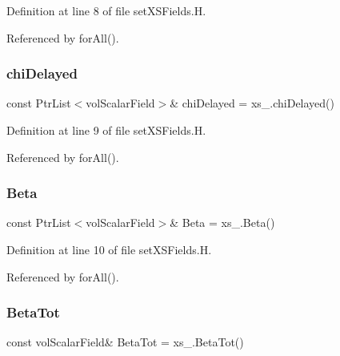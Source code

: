 Definition at line 8 of file set\+X\+S\+Fields.\+H.



Referenced by for\+All().

\mbox{\label{setXSFields_8H_a40cc7f7cbcb1b9e71096e95b125537c2}} 
\subsubsection{\texorpdfstring{chi\+Delayed}{chiDelayed}}
{\footnotesize\ttfamily const Ptr\+List$<$vol\+Scalar\+Field$>$\& chi\+Delayed = xs\+\_\+.\+chi\+Delayed()}



Definition at line 9 of file set\+X\+S\+Fields.\+H.



Referenced by for\+All().

\mbox{\label{setXSFields_8H_af87588a82c92b5a98302618c01213792}} 
\subsubsection{\texorpdfstring{Beta}{Beta}}
{\footnotesize\ttfamily const Ptr\+List$<$vol\+Scalar\+Field$>$\& Beta = xs\+\_\+.\+Beta()}



Definition at line 10 of file set\+X\+S\+Fields.\+H.



Referenced by for\+All().

\mbox{\label{setXSFields_8H_a3ad4facb2dd0406d605dcb63190ce6f1}} 
\subsubsection{\texorpdfstring{Beta\+Tot}{BetaTot}}
{\footnotesize\ttfamily const vol\+Scalar\+Field\& Beta\+Tot = xs\+\_\+.\+Beta\+Tot()}



